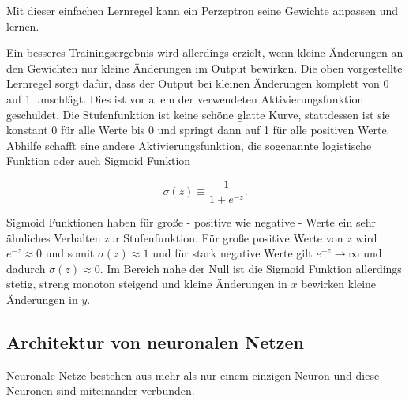 Mit dieser einfachen Lernregel kann ein Perzeptron seine Gewichte anpassen und lernen.\\
\par 
Ein besseres Trainingsergebnis wird allerdings erzielt, wenn kleine Änderungen an den Gewichten nur kleine Änderungen im Output bewirken. Die oben vorgestellte Lernregel sorgt dafür, dass der Output bei kleinen Änderungen komplett von 0 auf 1 umschlägt. Dies ist vor allem der verwendeten Aktivierungsfunktion geschuldet. Die Stufenfunktion ist keine schöne glatte Kurve, stattdessen ist sie konstant 0 für alle Werte bis 0 und springt dann auf 1 für alle positiven Werte. Abhilfe schafft eine andere Aktivierungsfunktion, die sogenannte logistische Funktion oder auch Sigmoid Funktion

\begin{equation}
	\sigma(z) \equiv \frac{1}{1 + e^{-z}}.
\end{equation}

Sigmoid Funktionen haben für große - positive wie negative - Werte ein sehr ähnliches Verhalten zur Stufenfunktion. Für große positive Werte von $z$ wird $e^{-z} \approx 0$ und somit $\sigma(z) \approx 1$ und für stark negative Werte gilt $e^{-z} \rightarrow \infty$ und dadurch $\sigma(z) \approx 0$. Im Bereich nahe der Null ist die Sigmoid Funktion allerdings stetig, streng monoton steigend und kleine Änderungen in $x$ bewirken kleine Änderungen in $y$.

\subsection{Architektur von neuronalen Netzen}
Neuronale Netze bestehen aus mehr als nur einem einzigen Neuron und diese Neuronen sind miteinander verbunden. 